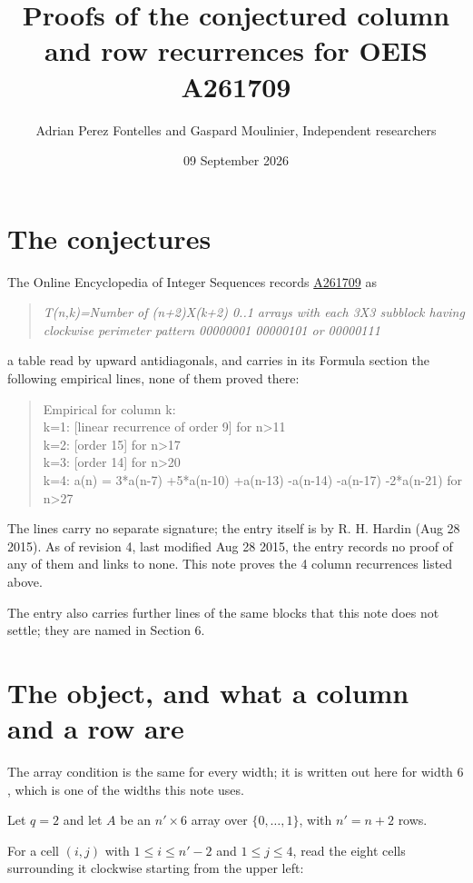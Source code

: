 \documentclass[11pt]{article}
\title{Proofs of the conjectured column and row recurrences for OEIS A261709}
\author{Adrian Perez Fontelles and Gaspard Moulinier, Independent researchers}
\date{09 September 2026}
\theoremstyle{definition}
\begin{document}
\maketitle
\section{The conjectures}

The Online Encyclopedia of Integer Sequences records \href{https://oeis.org/A261709}{A261709} as

\begin{quote}\itshape T(n,k)=Number of (n+2)X(k+2) 0..1 arrays with each 3X3 subblock having clockwise perimeter pattern 00000001 00000101 or 00000111\end{quote}

a table read by upward antidiagonals, and carries in its Formula section the following empirical lines, none of them proved there:

\begin{quote}\ttfamily Empirical for column k:\\
k=1: [linear recurrence of order 9] for n>11\\k=2: [order 15] for n>17\\k=3: [order 14] for n>20\\k=4: a(n) = 3*a(n-7) +5*a(n-10) +a(n-13) -a(n-14) -a(n-17) -2*a(n-21) for n>27\end{quote}

The lines carry no separate signature; the entry itself is by R. H. Hardin (Aug 28 2015). As of revision 4, last modified Aug 28 2015, the entry records no proof of any of them and links to none. This note proves the 4 column recurrences listed above.

The entry also carries further lines of the same blocks that this note does not settle; they are named in Section 6.

\section{The object, and what a column and a row are}

The array condition is the same for every width; it is written out here for width $6$, which is one of the widths this note uses.

Let $q = 2$ and let $A$ be an $n' \times 6$ array over $\{0,\dots,1\}$, with $n' = n + 2$ rows.

For a cell $(i,j)$ with $1 \le i \le n'-2$ and $1 \le j \le 4$, read the eight cells surrounding it clockwise starting from the upper left:
\end{document}
